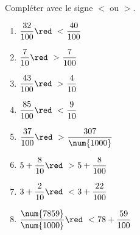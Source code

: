     Compléter avec le signe $<$ ou $>$. \medskip

    \begin{multicols}{2}
        \begin{spacing}{1.5}
            \begin{enumerate}
                \item $\dfrac{32}{100}                  {\red~<~} \dfrac{40}{100}$
                \item $\dfrac{7}{10}                    {\red~>~} \dfrac{7}{100}$
                \item $\dfrac{43}{100}                  {\red~>~} \dfrac{4}{10}$
                \item $\dfrac{85}{100}                  {\red~<~} \dfrac{9}{10}$
                \item $\dfrac{37}{100}                  {\red~>~} \dfrac{307}{\num{1000}}$
                \item $5+\dfrac{8}{10}                  {\red~>~} 5+\dfrac{8}{100}$
                \item $3+\dfrac{2}{10}                  {\red~<~} 3+\dfrac{22}{100}$
                \item $\dfrac{\num{7859}}{\num{1000}}   {\red~<~} 78+\dfrac{59}{100}$
            \end{enumerate}
        \end{spacing}
    \end{multicols}
